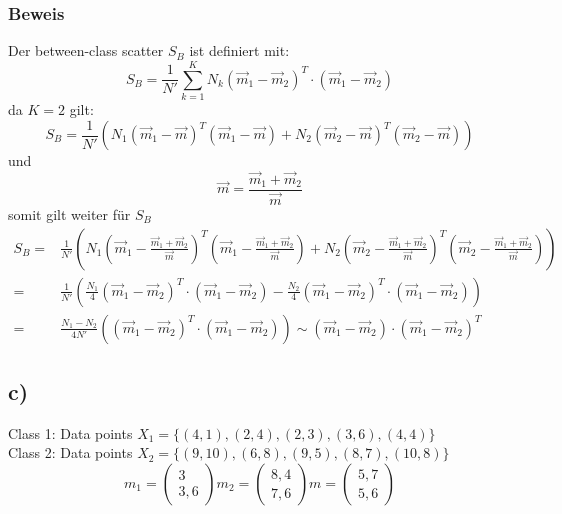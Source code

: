 \documentclass[a4paper,parskip=full-]{article}
\begin{document}
\subsubsection{Beweis}
Der  between-class scatter $S_B$ ist definiert mit:
$$
S_B = \frac{1}{N'} \sum^K_{k=1} N_k  \left( \vec{m}_1 - \vec{m}_2 \right)^T \cdot (\vec{m}_1 - \vec{m}_2)
$$
da $K=2$ gilt:
$$
S_B = \frac{1}{N'} \left( N_1 (\vec{m}_1 - \vec{m})^T (\vec{m}_1 - \vec{m}) + 
N_2 (\vec{m}_2 - \vec{m})^T (\vec{m}_2 - \vec{m})  \right)
$$
und 
$$
\vec{m} = \frac{\vec{m}_1 + \vec{m}_2}{\vec{m}}
$$
somit gilt weiter für $S_B$
\begin{equation}
\begin{aligned}
S_B = & \frac{1}{N'} 
\left( 
N_1 (\vec{m}_1 - \frac{\vec{m}_1 + \vec{m}_2}{\vec{m}})^T (\vec{m}_1 - \frac{\vec{m}_1 + \vec{m}_2}{\vec{m}}) + 
N_2 (\vec{m}_2 - \frac{\vec{m}_1 + \vec{m}_2}{\vec{m}})^T (\vec{m}_2 - \frac{\vec{m}_1 + \vec{m}_2}{\vec{m}})  
\right) \\
= & \frac{1}{N'} \left(
\frac{N_1}{4} \left( \vec{m}_1 - \vec{m}_2 \right)^T \cdot (\vec{m}_1 - \vec{m}_2) - 
\frac{N_2}{4} \left( \vec{m}_1 - \vec{m}_2 \right)^T \cdot (\vec{m}_1 - \vec{m}_2)
\right) \\
= & \frac{N_1 - N_2}{4 N'} 
\left(
\left(\vec{m}_1 - \vec{m}_2 \right)^T \cdot (\vec{m}_1 - \vec{m}_2)
\right)
\sim (\vec{m}_1 - \vec{m}_2) \cdot \left( \vec{m}_1 - \vec{m}_2 \right)^T
\end{aligned}
\end{equation}

\subsection{c)}
Class 1: Data points $X_1 = \{(4,1),(2,4),(2,3),(3,6),(4,4) \}$ \\
Class 2: Data points $X_2 = \{(9,10),(6,8),(9,5),(8,7),(10,8) \}$ \\

$$
m_1 = 
\begin{pmatrix}
3 \\ 3,6
\end{pmatrix}
m_2 = \begin{pmatrix}
8,4 \\ 7,6
\end{pmatrix}
m = \begin{pmatrix}
5,7 \\ 5,6
\end{pmatrix}
$$
\end{document}
